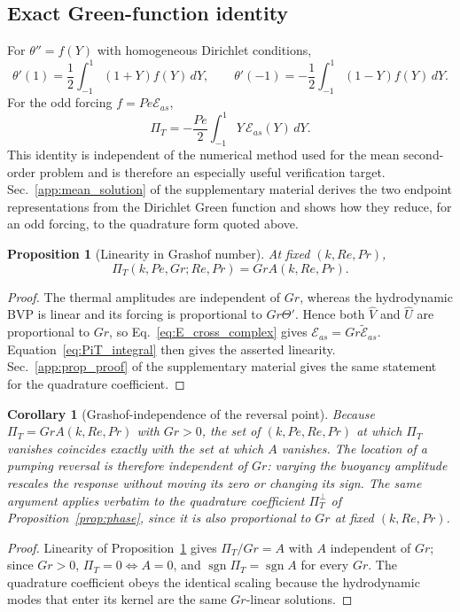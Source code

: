 \documentclass[12pt,a4paper]{article}
\newcommand{\Rey}{\mathit{Re}}
\newcommand{\Pe}{\mathit{Pe}}
\newcommand{\Grr}{\mathit{Gr}}
\renewcommand{\Pr}{\mathit{Pr}}
\newcommand{\PiT}{\Pi_T}
\newtheorem{proposition}{Proposition}
\newtheorem{corollary}{Corollary}
\begin{document}
\subsection{Exact Green-function identity}

For $\theta''=f(Y)$ with homogeneous Dirichlet conditions,
\begin{equation}
  \theta'(1)=\frac12\int_{-1}^{1}(1+Y)f(Y)\,dY,
  \qquad
  \theta'(-1)=-\frac12\int_{-1}^{1}(1-Y)f(Y)\,dY.
\end{equation}
For the odd forcing $f=\Pe\mathcal E_{as}$,
\begin{equation}
  \boxed{\PiT=-\frac{\Pe}{2}\int_{-1}^{1}Y\,\mathcal E_{as}(Y)\,dY.}
  \label{eq:PiT_integral}
\end{equation}
This identity is independent of the numerical method used for the mean second-order problem and is therefore
an especially useful verification target. Sec.~\ref{app:mean_solution} of the supplementary material derives the two endpoint
representations from the Dirichlet Green function and shows how they reduce, for an odd forcing, to the
quadrature form quoted above.

\begin{proposition}[Linearity in Grashof number]
\label{prop:grlinearity}
At fixed $(k,\Rey,\Pr)$,
\begin{equation}
  \PiT(k,\Pe,\Grr;\Rey,\Pr)=\Grr A(k,\Rey,\Pr).
  \label{eq:PiT_Gr}
\end{equation}
\end{proposition}
\begin{proof}
The thermal amplitudes are independent of $\Grr$, whereas the hydrodynamic BVP is linear and its forcing is
proportional to $\Grr\Theta'$. Hence both $\widehat V$ and $\widehat U$ are proportional to $\Grr$, so
Eq.~\eqref{eq:E_cross_complex} gives $\mathcal E_{as}=\Grr\widetilde{\mathcal E}_{as}$. Equation~\eqref{eq:PiT_integral}
then gives the asserted linearity. Sec.~\ref{app:prop_proof} of the supplementary material gives the same
statement for the quadrature coefficient.
\end{proof}

\begin{corollary}[Grashof-independence of the reversal point]
\label{cor:Gr_independence}
Because $\PiT=\Grr A(k,\Rey,\Pr)$ with $\Grr>0$, the set of
$(k,\Pe,\Rey,\Pr)$ at which $\PiT$ vanishes coincides exactly with the set at which
$A$ vanishes. The location of a pumping reversal is therefore independent of
$\Grr$: varying the buoyancy amplitude rescales the response without moving its
zero or changing its sign. The same argument applies verbatim to the quadrature
coefficient $\PiT^{\perp}$ of Proposition~\ref{prop:phase}, since it is also
proportional to $\Grr$ at fixed $(k,\Rey,\Pr)$.
\end{corollary}
\begin{proof}
Linearity of Proposition~\ref{prop:grlinearity} gives $\PiT/\Grr=A$ with $A$ independent of $\Grr$; since
$\Grr>0$, $\PiT=0\Longleftrightarrow A=0$, and $\operatorname{sgn}\PiT=\operatorname{sgn}A$
for every $\Grr$. The quadrature coefficient obeys the identical scaling because the
hydrodynamic modes that enter its kernel are the same $\Grr$-linear solutions.
\end{proof}
\end{document}
